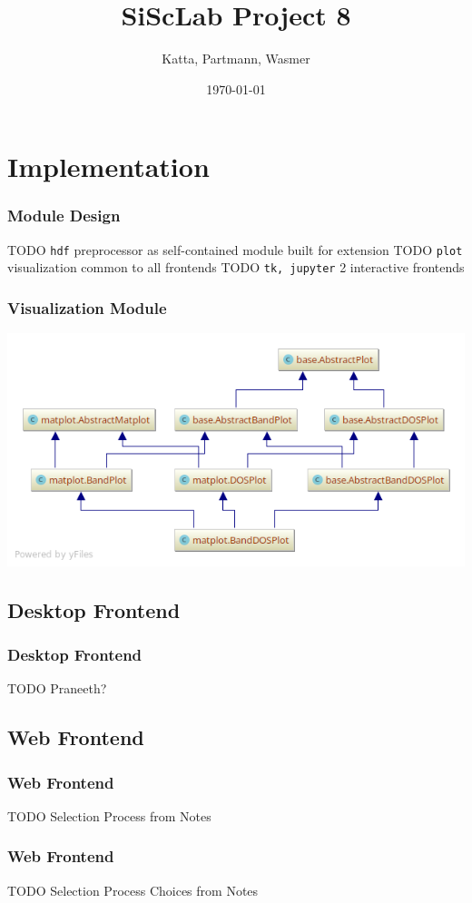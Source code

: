 \documentclass{beamer}
\begin{document}
\title{SiScLab Project 8}  
\author{Katta, Partmann, Wasmer}
\date{\today} 


\section{Implementation}
\label{sec:implementation}


\begin{frame}\frametitle{Module Design}
    TODO \texttt{hdf} preprocessor as self-contained module built for extension
    TODO \texttt{plot} visualization common to all frontends
    TODO \texttt{tk, jupyter} 2 interactive frontends 
\end{frame}



\begin{frame}\frametitle{Visualization Module}
    \includegraphics[scale=0.4]{img/pycharm_uml/matplot.png}
\end{frame}

\subsection{Desktop Frontend}
\label{sec:desktop-frontend}

\begin{frame}\frametitle{Desktop Frontend}
    TODO Praneeth?
\end{frame}

\subsection{Web Frontend}
\label{sec:web-frontend}

\begin{frame}\frametitle{Web Frontend}
    TODO Selection Process from Notes 
\end{frame}

\begin{frame}\frametitle{Web Frontend}
    TODO Selection Process Choices from Notes 
\end{frame}
\end{document}
